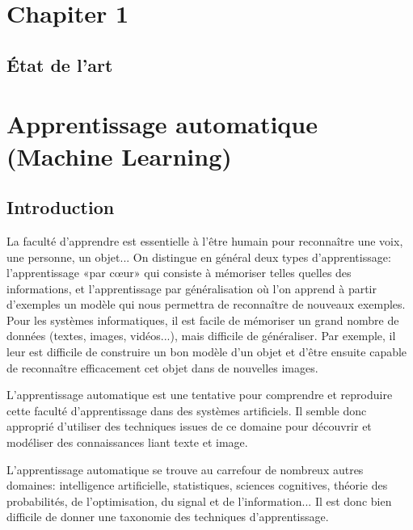 \documentclass[12pt]{article}
\begin{document}
\tableofcontents
\thispagestyle{empty}
\newpage


\listoffigures
{}
\cleardoublepage

\listoftables
{}
\cleardoublepage

\setcounter{page}{1}
\section*{\Huge{Chapiter 1}}
\subsection*{\huge{\' Etat de l'art}}
\newpage
{}
\section{Apprentissage automatique (Machine Learning)}
\subsection{Introduction}
La faculté d'apprendre est essentielle à l'être humain pour reconnaître une voix, une personne, un objet... On distingue en général deux types d'apprentissage: l'apprentissage «par cœur» qui consiste à mémoriser telles quelles des informations, et l'apprentissage par généralisation où l'on apprend à partir d'exemples un modèle qui nous permettra de reconnaître de nouveaux exemples. Pour les systèmes informatiques, il est facile de mémoriser un grand nombre de données (textes, images, vidéos...), mais difficile de généraliser. Par exemple, il leur est difficile de construire un bon modèle d'un objet et d'être ensuite capable de reconnaître efficacement cet objet dans de nouvelles images.

L'apprentissage automatique est une tentative pour comprendre et reproduire cette faculté d'apprentissage dans des systèmes artificiels. Il semble donc approprié d'utiliser des techniques issues de ce domaine pour découvrir et modéliser des connaissances liant texte et image.

L'apprentissage automatique se trouve au carrefour de nombreux autres domaines: intelligence artificielle, statistiques, sciences cognitives, théorie des probabilités, de l'optimisation, du signal et de l'information... Il est donc bien difficile de donner une taxonomie des techniques d'apprentissage.
\end{document}
